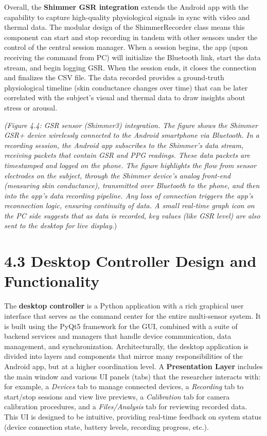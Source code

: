 \documentclass[11pt,a4paper]{report}
\begin{document}
Overall, the \textbf{Shimmer GSR integration} extends the Android app with
the capability to capture high-quality physiological signals in sync
with video and thermal data. The modular design of the ShimmerRecorder class
means this component can start and stop recording in tandem with other
sensors under the control of the central session manager. When a session
begins, the app (upon receiving the command from PC) will initialize the
Bluetooth link, start the data stream, and begin logging GSR. When the
session ends, it closes the connection and finalizes the CSV file. The
data recorded provides a ground-truth physiological timeline (skin
conductance changes over time) that can be later correlated with the
subject's visual and thermal data to draw insights about stress or
arousal.

\textit{(Figure 4.4: GSR sensor (Shimmer3) integration. The figure shows the
Shimmer GSR+ device wirelessly connected to the Android smartphone via
Bluetooth. In a recording session, the Android app subscribes to the
Shimmer's data stream, receiving packets that contain GSR and PPG
readings. These data packets are timestamped and logged on the phone.
The figure highlights the flow from} \textit{sensor electrodes on the subject,
through the Shimmer device's analog front-end (measuring skin
conductance), transmitted over Bluetooth to the phone, and then into the
app's data recording pipeline. Any loss of connection triggers the app's
reconnection logic, ensuring continuity of data. A small real-time graph
icon on the PC side suggests that as data is recorded, key values (like
GSR level) are also sent to the desktop for live display.})

\section{4.3 Desktop Controller Design and Functionality}

The \textbf{desktop controller} is a Python application with a rich graphical
user interface that serves as the command center for the entire
multi-sensor system. It is built using the PyQt5 framework for the GUI,
combined with a suite of backend services and managers that handle
device communication, data management, and synchronization.
Architecturally, the desktop application is divided into layers and
components that mirror many responsibilities of the Android app, but at
a higher coordination level. A \textbf{Presentation Layer} includes the main
window and various UI panels (tabs) that the researcher interacts with:
for example, a \textit{Devices} tab to manage connected devices, a \textit{Recording}
tab to start/stop sessions and view live previews, a \textit{Calibration} tab
for camera calibration procedures, and a \textit{Files/Analysis} tab for
reviewing recorded data. This UI is designed to be intuitive, providing
real-time feedback on system status (device connection state, battery
levels, recording progress,
etc.)\cite{ContactlessStressThermal2022}.
\end{document}
